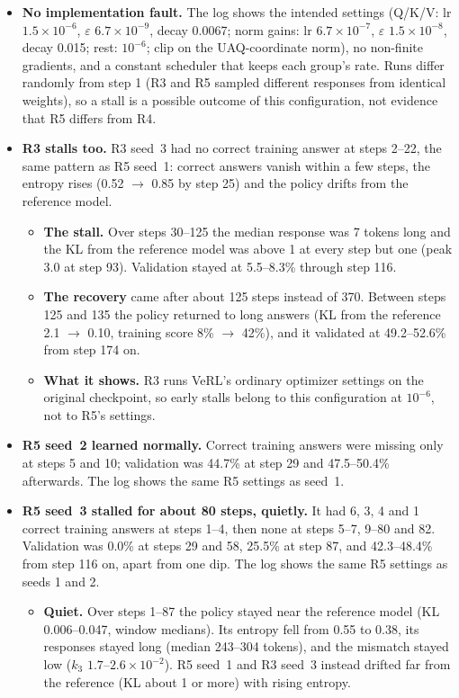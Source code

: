 \documentclass[11pt]{article}
\begin{document}
\begin{itemize}
\item \textbf{No implementation fault.} The log shows the intended settings (Q/K/V: lr $1.5\times10^{-6}$, $\varepsilon$ $6.7\times10^{-9}$, decay 0.0067; norm gains: lr $6.7\times10^{-7}$, $\varepsilon$ $1.5\times10^{-8}$, decay 0.015; rest: $10^{-6}$; clip on the UAQ-coordinate norm), no non-finite gradients, and a constant scheduler that keeps each group's rate. Runs differ randomly from step 1 (R3 and R5 sampled different responses from identical weights), so a stall is a possible outcome of this configuration, not evidence that R5 differs from R4.
\item \textbf{R3 stalls too.} R3 seed~3 had no correct training answer at steps 2--22, the same pattern as R5 seed~1: correct answers vanish within a few steps, the entropy rises (0.52 $\to$ 0.85 by step 25) and the policy drifts from the reference model.
  \begin{itemize}
  \item \textbf{The stall.} Over steps 30--125 the median response was 7 tokens long and the KL from the reference model was above 1 at every step but one (peak 3.0 at step 93). Validation stayed at 5.5--8.3\% through step 116.
  \item \textbf{The recovery} came after about 125 steps instead of 370. Between steps 125 and 135 the policy returned to long answers (KL from the reference 2.1 $\to$ 0.10, training score 8\% $\to$ 42\%), and it validated at 49.2--52.6\% from step 174 on.
  \item \textbf{What it shows.} R3 runs VeRL's ordinary optimizer settings on the original checkpoint, so early stalls belong to this configuration at $10^{-6}$, not to R5's settings.
  \end{itemize}
\item \textbf{R5 seed~2 learned normally.} Correct training answers were missing only at steps 5 and 10; validation was 44.7\% at step 29 and 47.5--50.4\% afterwards. The log shows the same R5 settings as seed~1.
\item \textbf{R5 seed~3 stalled for about 80 steps, quietly.} It had 6, 3, 4 and 1 correct training answers at steps 1--4, then none at steps 5--7, 9--80 and 82. Validation was 0.0\% at steps 29 and 58, 25.5\% at step 87, and 42.3--48.4\% from step 116 on, apart from one dip. The log shows the same R5 settings as seeds 1 and 2.
  \begin{itemize}
  \item \textbf{Quiet.} Over steps 1--87 the policy stayed near the reference model (KL 0.006--0.047, window medians). Its entropy fell from 0.55 to 0.38, its responses stayed long (median 243--304 tokens), and the mismatch stayed low ($k_3$ $1.7$--$2.6\times10^{-2}$). R5 seed~1 and R3 seed~3 instead drifted far from the reference (KL about 1 or more) with rising entropy.

\end{itemize}
\end{itemize}
\end{document}

